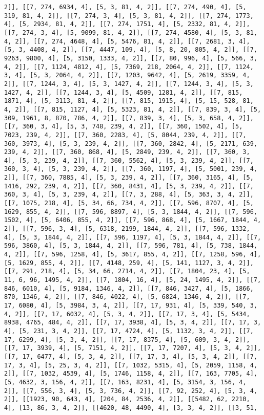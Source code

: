 \documentclass[12pt,fleqn]{article}\usepackage{../../common}
\begin{document}
\begin{verbatim}
2]], [[7, 274, 6934, 4], [5, 3, 81, 4, 2]], [[7, 274, 490, 4], [5, 319, 81, 4, 2]], [[7, 274, 3, 4], [5, 3, 81, 4, 2]], [[7, 274, 1773, 4], [5, 2934, 81, 4, 2]], [[7, 274, 1751, 4], [5, 2332, 81, 4, 2]], [[7, 274, 3, 4], [5, 9099, 81, 4, 2]], [[7, 274, 4580, 4], [5, 3, 81, 4, 2]], [[7, 274, 4648, 4], [5, 5476, 81, 4, 2]], [[7, 2681, 3, 4], [5, 3, 4408, 4, 2]], [[7, 4447, 109, 4], [5, 8, 20, 805, 4, 2]], [[7, 9263, 9800, 4], [5, 3150, 1333, 4, 2]], [[7, 80, 996, 4], [5, 566, 3, 4, 2]], [[7, 1124, 4812, 4], [5, 7369, 218, 2064, 4, 2]], [[7, 1124, 3, 4], [5, 3, 2064, 4, 2]], [[7, 1203, 9642, 4], [5, 2619, 3359, 4, 2]], [[7, 1244, 3, 4], [5, 3, 1427, 4, 2]], [[7, 1244, 3, 4], [5, 3, 1427, 4, 2]], [[7, 1244, 3, 4], [5, 4509, 1281, 4, 2]], [[7, 815, 1871, 4], [5, 3113, 81, 4, 2]], [[7, 815, 1915, 4], [5, 15, 528, 81, 4, 2]], [[7, 815, 1127, 4], [5, 5323, 81, 4, 2]], [[7, 839, 3, 4], [5, 309, 1961, 8, 870, 786, 4, 2]], [[7, 839, 3, 4], [5, 3, 658, 4, 2]], [[7, 360, 3, 4], [5, 3, 748, 239, 4, 2]], [[7, 360, 1502, 4], [5, 7023, 239, 4, 2]], [[7, 360, 2283, 4], [5, 8044, 239, 4, 2]], [[7, 360, 3973, 4], [5, 3, 239, 4, 2]], [[7, 360, 2842, 4], [5, 2171, 639, 239, 4, 2]], [[7, 360, 868, 4], [5, 2849, 239, 4, 2]], [[7, 360, 3, 4], [5, 3, 239, 4, 2]], [[7, 360, 5562, 4], [5, 3, 239, 4, 2]], [[7, 360, 3, 4], [5, 3, 239, 4, 2]], [[7, 360, 1197, 4], [5, 5001, 239, 4, 2]], [[7, 360, 7885, 4], [5, 3, 239, 4, 2]], [[7, 360, 3165, 4], [5, 1416, 292, 239, 4, 2]], [[7, 360, 8431, 4], [5, 3, 239, 4, 2]], [[7, 360, 3, 4], [5, 3, 239, 4, 2]], [[7, 3, 288, 4], [5, 363, 3, 4, 2]], [[7, 1075, 218, 4], [5, 34, 66, 734, 4, 2]], [[7, 596, 8707, 4], [5, 1629, 855, 4, 2]], [[7, 596, 8897, 4], [5, 3, 1844, 4, 2]], [[7, 596, 1502, 4], [5, 6406, 855, 4, 2]], [[7, 596, 868, 4], [5, 1667, 1844, 4, 2]], [[7, 596, 3, 4], [5, 6318, 2199, 1844, 4, 2]], [[7, 596, 1332, 4], [5, 3, 1844, 4, 2]], [[7, 596, 1197, 4], [5, 3, 1844, 4, 2]], [[7, 596, 3860, 4], [5, 3, 1844, 4, 2]], [[7, 596, 781, 4], [5, 738, 1844, 4, 2]], [[7, 596, 1258, 4], [5, 3617, 855, 4, 2]], [[7, 1258, 596, 4], [5, 1629, 855, 4, 2]], [[7, 4148, 259, 4], [5, 141, 1127, 3, 4, 2]], [[7, 291, 218, 4], [5, 34, 66, 2714, 4, 2]], [[7, 1804, 23, 4], [5, 11, 6, 96, 1495, 4, 2]], [[7, 1804, 16, 4], [5, 24, 1495, 4, 2]], [[7, 846, 6010, 4], [5, 9184, 1346, 4, 2]], [[7, 846, 3427, 4], [5, 1866, 870, 1346, 4, 2]], [[7, 846, 4022, 4], [5, 6824, 1346, 4, 2]], [[7, 17, 6080, 4], [5, 3984, 3, 4, 2]], [[7, 17, 931, 4], [5, 339, 540, 3, 4, 2]], [[7, 17, 6032, 4], [5, 3, 4, 2]], [[7, 17, 3, 4], [5, 5434, 8938, 4765, 484, 4, 2]], [[7, 17, 3938, 4], [5, 3, 4, 2]], [[7, 17, 3, 4], [5, 231, 3, 4, 2]], [[7, 17, 4724, 4], [5, 1132, 3, 4, 2]], [[7, 17, 6299, 4], [5, 3, 4, 2]], [[7, 17, 8375, 4], [5, 609, 3, 4, 2]], [[7, 17, 3939, 4], [5, 7151, 4, 2]], [[7, 17, 7207, 4], [5, 3, 4, 2]], [[7, 17, 6477, 4], [5, 3, 4, 2]], [[7, 17, 3, 4], [5, 3, 4, 2]], [[7, 17, 3, 4], [5, 25, 3, 4, 2]], [[7, 1032, 5315, 4], [5, 2059, 1158, 4, 2]], [[7, 1032, 4539, 4], [5, 1746, 1158, 4, 2]], [[7, 163, 7705, 4], [5, 4632, 3, 156, 4, 2]], [[7, 163, 8231, 4], [5, 3154, 3, 156, 4, 2]], [[7, 556, 3, 4], [5, 3, 736, 4, 2]], [[7, 92, 252, 4], [5, 3, 4, 2]], [[1923, 90, 643, 4], [204, 84, 2536, 4, 2]], [[5482, 62, 2210, 4], [13, 86, 3, 4, 2]], [[4620, 48, 4490, 4], [3, 3, 4, 2]], [[3, 51, 
\end{verbatim}
\end{document}
